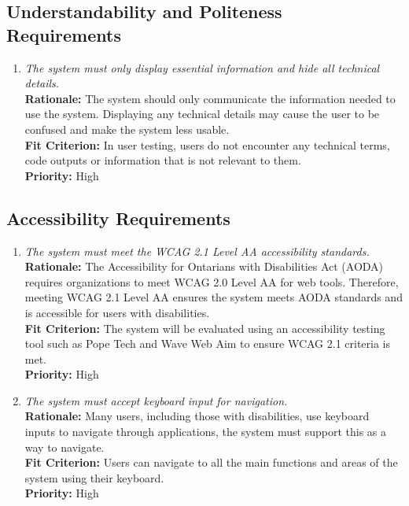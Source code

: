 \documentclass[12pt]{article}
\begin{document}
\subsection{Understandability and Politeness Requirements}
\begin{enumerate}[label=UHR-LR \arabic*., wide=0pt, leftmargin=*]
  \item \emph{The system must only display essential information and
    hide all technical details.}\\[2mm]
    {\bf Rationale:} The system should only communicate the
    information needed to use the system. Displaying any technical
    details may cause the user to be confused and make the system
    less usable.   \\
    {\bf Fit Criterion:} In user testing, users do not encounter any
    technical terms, code outputs or information that is not relevant
    to them.  \\
    {\bf Priority:} High
\end{enumerate}

\subsection{Accessibility Requirements}
\begin{enumerate}[label=UHR-AR \arabic*., wide=0pt, leftmargin=*]
  \item \emph{The system must meet the WCAG 2.1 Level AA
    accessibility standards.}\\[2mm]
    {\bf Rationale:} The Accessibility for Ontarians with
    Disabilities Act (AODA) requires organizations to meet WCAG 2.0
    Level AA for web tools. Therefore, meeting WCAG 2.1 Level AA
    ensures the system meets AODA standards and is accessible for
    users with disabilities.  \\
    {\bf Fit Criterion:} The system will be evaluated using an
    accessibility testing tool such as Pope Tech and Wave Web Aim to
    ensure WCAG 2.1 criteria is met.\\
    {\bf Priority:} High
  \item \emph{The system must accept keyboard input for navigation.}\\[2mm]
    {\bf Rationale:} Many users, including those with disabilities,
    use keyboard inputs to navigate through applications, the system
    must support this as a way to navigate.\\
    {\bf Fit Criterion:} Users can navigate to all the main functions
    and areas of the system using their keyboard. \\
    {\bf Priority:} High
\end{enumerate}
\end{document}
